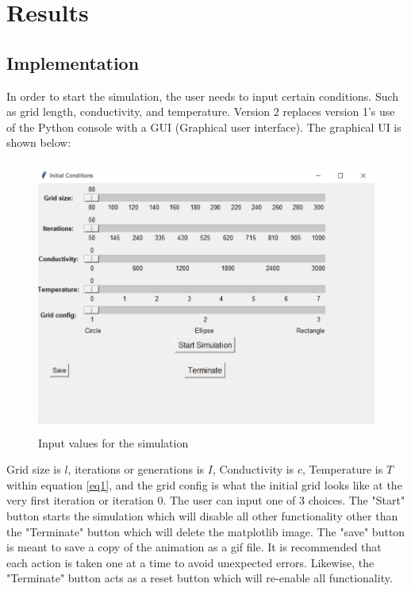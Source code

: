 \chapter{Results}
\section{Implementation}
In order to start the simulation, the user needs to input certain conditions. Such as grid length, conductivity, and temperature. Version 2 replaces version 1's use of the Python console with a GUI (Graphical user interface). The graphical UI is shown below: 
\begin{figure}[H]
    \centering
    \includegraphics[height=9cm,width=13cm]{images/GUI.png}
    \caption{Input values for the simulation}
    \label{fig:my_GUI}
\end{figure}
Grid size is $l$, iterations or generations is $I$, Conductivity is $c$, Temperature is $T$ within equation \ref{eq1}, and the grid config is what the initial grid looks like at the very first iteration or iteration 0. The user can input one of 3 choices. The "Start" button starts the simulation which will disable all other functionality other than the "Terminate" button which will delete the matplotlib image. The "save" button is meant to save a copy of the animation as a gif file. It is recommended that each action is taken one at a time to avoid unexpected errors. Likewise, the "Terminate" button acts as a reset button which will re-enable all functionality. \par

